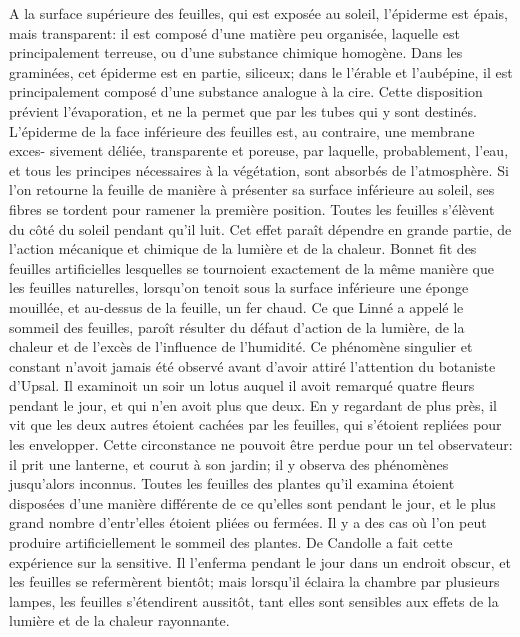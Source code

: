 A la surface supérieure des feuilles, qui est exposée au soleil, l’épiderme est épais, mais transparent: il est composé d’une matière peu organisée, laquelle est principalement terreuse, ou d’une substance chimique homogène. Dans les graminées, cet épiderme est en partie, siliceux; dans le l’érable et l’aubépine, il est principalement composé d’une substance analogue à la cire. Cette disposition prévient l’évaporation, et ne la permet que par les tubes qui y sont destinés.
L’épiderme de la face inférieure des feuilles est, au contraire, une membrane exces-\setcounter{page}{384} sivement déliée, transparente et poreuse, par laquelle, probablement, l'eau, et tous les principes nécessaires à la végétation, sont absorbés de l'atmosphère.
Si l'on retourne la feuille de manière à présenter sa surface inférieure au soleil, ses fibres se tordent pour ramener la première position. Toutes les feuilles s'élèvent du côté du soleil pendant qu'il luit. Cet effet paraît dépendre en grande partie, de l'action mécanique et chimique de la lumière et de la chaleur. Bonnet fit des feuilles artificielles lesquelles se tournoient exactement de la même manière que les feuilles naturelles, lorsqu'on tenoit sous la surface inférieure une éponge mouillée, et au-dessus de la feuille, un fer chaud.
Ce que Linné a appelé le sommeil des feuilles, paroît résulter du défaut d'action de la lumière, de la chaleur et de l'excès de l'influence de l'humidité. Ce phénomène singulier et constant n'avoit jamais été observé avant d'avoir attiré l'attention du botaniste d'Upsal. Il examinoit un soir un lotus auquel il avoit remarqué quatre fleurs pendant le jour, et qui n'en avoit plus que deux. En y regardant de plus près, il vit que les deux autres étoient cachées par les feuilles, qui s'étoient repliées pour les envelopper. Cette\setcounter{page}{385} circonstance ne pouvoit être perdue pour un tel observateur: il prit une lanterne, et courut à son jardin; il y observa des phénomènes jusqu'alors inconnus. Toutes les feuilles des plantes qu'il examina étoient disposées d'une manière différente de ce qu'elles sont pendant le jour, et le plus grand nombre d'entr'elles étoient pliées ou fermées.
Il y a des cas où l'on peut produire artificiellement le sommeil des plantes. De Candolle a fait cette expérience sur la sensitive. Il l'enferma pendant le jour dans un endroit obscur, et les feuilles se refermèrent bientôt; mais lorsqu'il éclaira la chambre par plusieurs lampes, les feuilles s'étendirent aussitôt, tant elles sont sensibles aux effets de la lumière et de la chaleur rayonnante.
